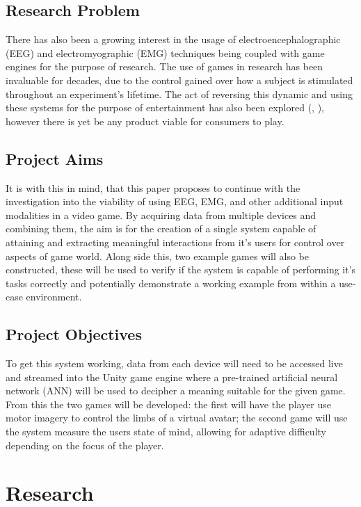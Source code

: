 \documentclass[11pt, a4paper]{article}
\newcommand{\ccite}[1]{(\citeauthor{#1}, \citeyear{#1})}
\begin{document}
\subsection{Research Problem}
There has also been a growing interest in the usage of electroencephalographic (EEG) and electromyographic (EMG) techniques being coupled with game engines for the purpose of research. The use of games in research has been invaluable for decades, due to the control gained over how a subject is stimulated throughout an experiment's lifetime. The act of reversing this dynamic and using these systems for the purpose of entertainment has also been explored \ccite{6518141}, however there is yet be any product viable for consumers to play. 

\subsection{Project Aims}
It is with this in mind, that this paper proposes to continue with the investigation into the viability of using EEG, EMG, and other additional input modalities in a video game. By acquiring data from multiple devices and combining them, the aim is for the creation of a single system capable of attaining and extracting meaningful interactions from it's users for control over aspects of game world. Along side this, two example games will also be constructed, these will be used to verify if the system is capable of performing it's tasks correctly and potentially demonstrate a working example from within a use-case environment.

\subsection{Project Objectives}
To get this system working, data from each device will need to be accessed live and streamed into the Unity game engine where a pre-trained artificial neural network (ANN) will be used to decipher a meaning suitable for the given game. From this the two games will be developed: the first will have the player use motor imagery to control the limbs of a virtual avatar; the second game will use the system measure the users state of mind, allowing for adaptive difficulty depending on the focus of the player.

\pagebreak
\section{Research}	
\end{document}
